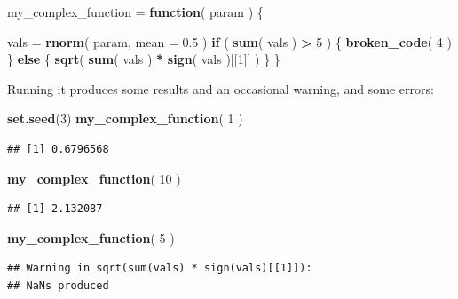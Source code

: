 \documentclass[
]{book}
\newenvironment{Shaded}{\begin{snugshade}}{\end{snugshade}}
\newcommand{\AttributeTok}[1]{\textcolor[rgb]{0.13,0.29,0.53}{#1}}
\newcommand{\ControlFlowTok}[1]{\textcolor[rgb]{0.13,0.29,0.53}{\textbf{#1}}}
\newcommand{\DecValTok}[1]{\textcolor[rgb]{0.00,0.00,0.81}{#1}}
\newcommand{\FloatTok}[1]{\textcolor[rgb]{0.00,0.00,0.81}{#1}}
\newcommand{\FunctionTok}[1]{\textcolor[rgb]{0.13,0.29,0.53}{\textbf{#1}}}
\newcommand{\NormalTok}[1]{#1}
\newcommand{\OtherTok}[1]{\textcolor[rgb]{0.56,0.35,0.01}{#1}}
\newcommand{\SpecialCharTok}[1]{\textcolor[rgb]{0.81,0.36,0.00}{\textbf{#1}}}
\begin{document}
\begin{Shaded}
\begin{Highlighting}[]
\NormalTok{my\_complex\_function }\OtherTok{=} \ControlFlowTok{function}\NormalTok{( param ) \{}
    
\NormalTok{    vals }\OtherTok{=} \FunctionTok{rnorm}\NormalTok{( param, }\AttributeTok{mean =} \FloatTok{0.5}\NormalTok{ )}
    \ControlFlowTok{if}\NormalTok{ ( }\FunctionTok{sum}\NormalTok{( vals ) }\SpecialCharTok{\textgreater{}} \DecValTok{5}\NormalTok{ ) \{}
        \FunctionTok{broken\_code}\NormalTok{( }\DecValTok{4}\NormalTok{ )}
\NormalTok{    \} }\ControlFlowTok{else}\NormalTok{ \{}
        \FunctionTok{sqrt}\NormalTok{( }\FunctionTok{sum}\NormalTok{( vals ) }\SpecialCharTok{*} \FunctionTok{sign}\NormalTok{( vals )[[}\DecValTok{1}\NormalTok{]] )}
\NormalTok{    \}}
\NormalTok{\}}
\end{Highlighting}
\end{Shaded}

Running it produces some results and an occasional warning, and some errors:

\begin{Shaded}
\begin{Highlighting}[]
\FunctionTok{set.seed}\NormalTok{(}\DecValTok{3}\NormalTok{)}
\FunctionTok{my\_complex\_function}\NormalTok{( }\DecValTok{1}\NormalTok{ )}
\end{Highlighting}
\end{Shaded}

\begin{verbatim}
## [1] 0.6796568
\end{verbatim}

\begin{Shaded}
\begin{Highlighting}[]
\FunctionTok{my\_complex\_function}\NormalTok{( }\DecValTok{10}\NormalTok{ )}
\end{Highlighting}
\end{Shaded}

\begin{verbatim}
## [1] 2.132087
\end{verbatim}

\begin{Shaded}
\begin{Highlighting}[]
\FunctionTok{my\_complex\_function}\NormalTok{( }\DecValTok{5}\NormalTok{ )}
\end{Highlighting}
\end{Shaded}

\begin{verbatim}
## Warning in sqrt(sum(vals) * sign(vals)[[1]]):
## NaNs produced
\end{verbatim}
\end{document}
